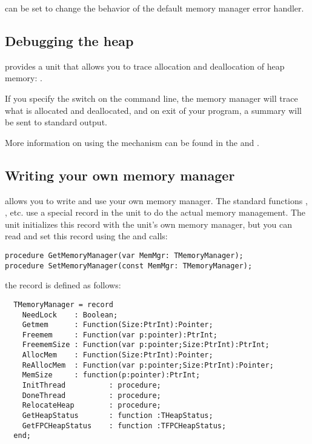 can be set to change the behavior of 
the default memory manager error handler.

\subsection{Debugging the heap}

\fpc provides a unit that allows you to trace allocation and deallocation
of heap memory: .

If you specify the  switch on the command line, the memory manager
will trace what is allocated and deallocated, and on exit of your program,
a summary will be sent to standard output.

More information on using the  mechanism can be found in the
\userref and \unitsref.

\subsection{Writing your own memory manager}

\fpc allows you to write and use your own memory manager. The standard
functions , ,  etc.
use a special record in the  unit to do the actual memory management.
The  unit initializes this record with the  unit's own memory
manager, but you can read and set this record using the
 and  calls:
\begin{verbatim}
procedure GetMemoryManager(var MemMgr: TMemoryManager);
procedure SetMemoryManager(const MemMgr: TMemoryManager);
\end{verbatim}

the  record is defined as follows:
\begin{verbatim}
  TMemoryManager = record
    NeedLock    : Boolean;
    Getmem      : Function(Size:PtrInt):Pointer;
    Freemem     : Function(var p:pointer):PtrInt;
    FreememSize : Function(var p:pointer;Size:PtrInt):PtrInt;
    AllocMem    : Function(Size:PtrInt):Pointer;
    ReAllocMem  : Function(var p:pointer;Size:PtrInt):Pointer;
    MemSize     : function(p:pointer):PtrInt;
    InitThread          : procedure;
    DoneThread          : procedure;
    RelocateHeap        : procedure;
    GetHeapStatus       : function :THeapStatus;
    GetFPCHeapStatus    : function :TFPCHeapStatus;
  end;
\end{verbatim}

